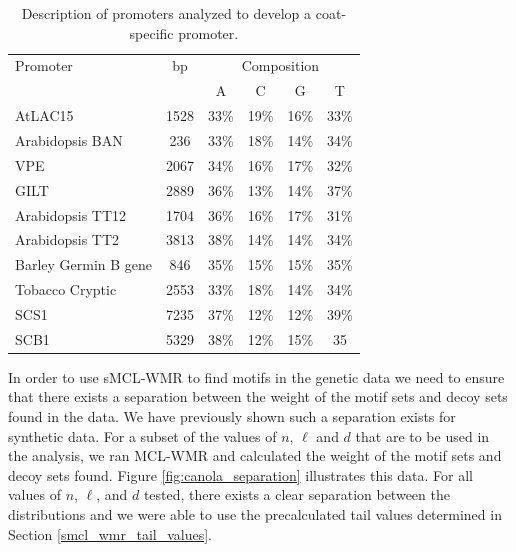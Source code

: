 \begin{table}[h!]
\begin{center} {
\begin{tabular}{|l|c|cccc|}     
\hline	
Promoter		& bp		& \multicolumn{4}{c|}{Composition} \\		
					&						& A 			& C 			& G 			& T \\
\hline
\hline
 AtLAC15 		&1528 				& 33\%  	& 19\%  	& 16\% 	& 33\% \\
\hline
Arabidopsis BAN & 236 		& 33\%  	& 18\%  	 & 14\%  	& 34\% \\
\hline
VPE				& 2067 			& 34\%  	& 16\%  	& 17\%  	& 32\% \\
\hline
GILT 			& 2889 			& 36\%  	& 13\%  	& 14\%  	& 37\% \\
\hline
Arabidopsis TT12 & 1704	& 36\%  	&16\%  	& 17\%  	& 31\%\\
\hline
Arabidopsis TT2  & 3813 	& 38\%  	& 14\%   	& 14\%  	& 34\% \\
\hline
Barley Germin B gene & 846 & 35\% 	& 15\%		& 15\%		& 35\%\\
\hline
Tobacco Cryptic       & 2553 & 33\%  	& 18\%  	 & 14\%  	& 34\% \\
\hline
SCS1							& 7235 & 37\%  	& 12\% 	& 12\%  	& 39\% \\
\hline
SCB1 						& 5329	& 38\%		& 12\%		& 15\%		& 35\\ 
\hline
	\end{tabular}}
	\end{center}
	\caption[Description of promoters analyzed to develop a coat-specific promoter.]{Description of promoters analyzed to develop a coat-specific promoter.}
\label{table:promoters}
\end{table}


In order to use sMCL-WMR to find motifs in the genetic data we need to ensure that there exists a separation between the weight of the motif sets and decoy sets found in the data.  We have previously shown such a separation exists for synthetic data.  For a subset of the values of $n$, $\ell$ and $d$ that are to be used in the analysis, we ran MCL-WMR and calculated the weight of the motif sets and decoy sets found.  Figure \ref{fig:canola_separation} illustrates this data. For all values of $n$, $\ell$, and $d$ tested, there exists a clear separation between the distributions and we were able to use the precalculated tail values determined in Section \ref{smcl_wmr_tail_values}.

